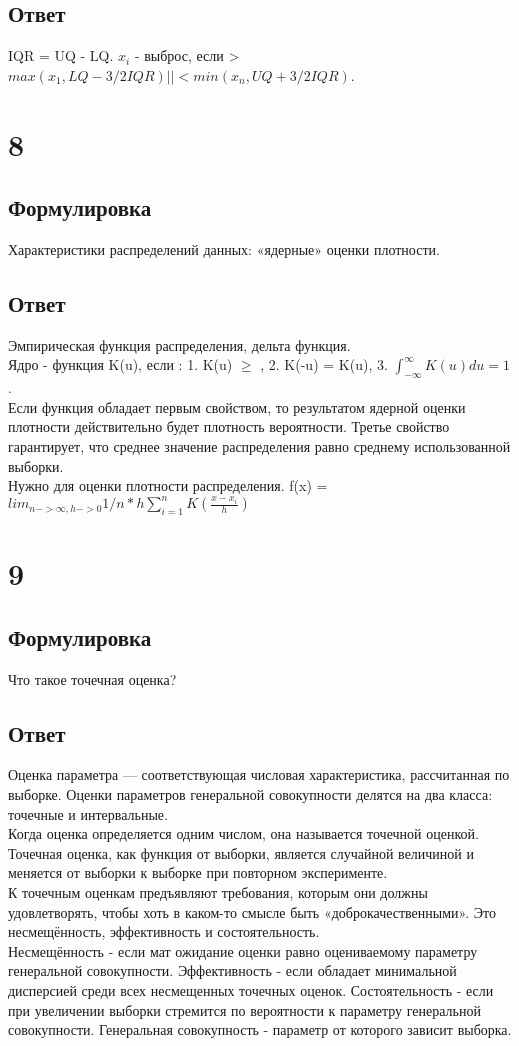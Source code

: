 \documentclass[a4]{article}
\begin{document}
	\subsection*{Ответ}
	IQR = UQ - LQ. $x_i$ - выброс, если > $max(x_1, LQ - 3/2 IQR) || < min(x_n, UQ + 3/2 IQR)$.
	
	\section{8}
	\subsection*{Формулировка}
	Характеристики распределений данных: «ядерные» оценки плотности.
	\subsection*{Ответ}
	Эмпирическая функция распределения, дельта функция.\\
	Ядро - функция K(u), если : 1. K(u) $\geq$ , 2. K(-u) = K(u), 3. $\int_{-\infty}^{\infty} K(u) du = 1$.\\
	Если функция обладает первым свойством, то результатом ядерной оценки плотности действительно будет плотность вероятности. Третье свойство гарантирует, что среднее значение распределения равно среднему использованной выборки.\\
	Нужно для оценки плотности распределения. f(x) = $lim_{n -> \infty, h -> 0} 1/n * h \sum_{i = 1}^n K(\frac{x-x_i}{h})$
	
	
	\section{9}
	\subsection*{Формулировка}
	Что такое точечная оценка?
	\subsection*{Ответ}
	Оценка параметра — соответствующая числовая характеристика, рассчитанная по выборке. Оценки параметров генеральной совокупности делятся на два класса: точечные и интервальные.\\
	Когда оценка определяется одним числом, она называется точечной оценкой. Точечная оценка, как функция от выборки, является случайной величиной и меняется от выборки к выборке при повторном эксперименте.\\
	К точечным оценкам предъявляют требования, которым они должны удовлетворять, чтобы хоть в каком-то смысле быть «доброкачественными». Это несмещённость, эффективность и состоятельность.\\
	Несмещённость - если мат ожидание оценки равно оцениваемому параметру генеральной совокупности. Эффективность - если обладает минимальной дисперсией среди всех несмещенных точечных оценок. Состоятельность - если при увеличении выборки стремится по вероятности к параметру генеральной совокупности. Генеральная совокупность - параметр от которого зависит выборка.\\
	
\end{document}
